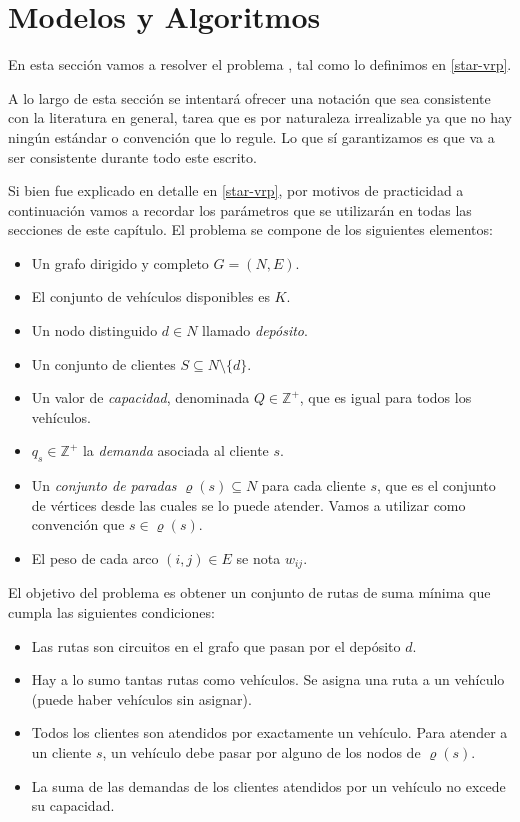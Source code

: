 \chapter{Modelos y Algoritmos}
\label{chapter:algoritmos}

En esta sección vamos a resolver el problema , tal como lo definimos en \ref{star-vrp}.

A lo largo de esta sección se intentará ofrecer una notación que sea consistente con la literatura en general, tarea que es por naturaleza irrealizable ya que no hay ningún estándar o convención que lo regule. Lo que sí garantizamos es que va a ser consistente durante todo este escrito.

Si bien fue explicado en detalle en \ref{star-vrp}, por motivos de practicidad a continuación vamos a recordar los parámetros que se utilizarán en todas las secciones de este capítulo. El problema se compone de los siguientes elementos:

\begin{itemize}
    \item Un grafo dirigido y completo $G = (N, E)$.
    \item El conjunto de vehículos disponibles es $K$.
    \item Un nodo distinguido $d \in N$ llamado \emph{depósito}.
    \item Un conjunto de clientes $S \subseteq N \setminus \{d\}$.
    \item Un valor de \emph{capacidad}, denominada $Q \in \mathbb{Z}^{+}$, que es igual para todos los vehículos.
    \item  $q_s \in \mathbb{Z}^{+}$ la \emph{demanda} asociada al cliente $s$.
    \item Un \emph{conjunto de paradas} $\varrho(s) \subseteq N$ para cada cliente $s$, que es el conjunto de vértices desde las cuales se lo puede atender. Vamos a utilizar como convención que $s \in \varrho(s)$.
    \item El peso de cada arco $(i, j) \in E$ se nota $w_{ij}$.
\end{itemize}

El objetivo del problema es obtener un conjunto de rutas de suma mínima que cumpla las siguientes condiciones:

\begin{itemize}
\label{list:restrictions}
    \item Las rutas son circuitos en el grafo que pasan por el depósito $d$.
    \item Hay a lo sumo tantas rutas como vehículos. Se asigna una ruta a un vehículo (puede haber vehículos sin asignar).
    \item Todos los clientes son atendidos por exactamente un vehículo. Para atender a un cliente $s$, un vehículo debe pasar por alguno de los nodos de $\varrho(s)$.
    \item La suma de las demandas de los clientes atendidos por un vehículo no excede su capacidad.
\end{itemize}

